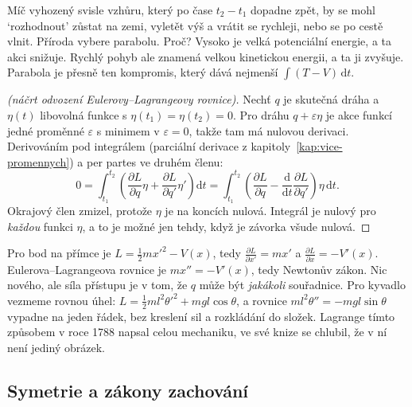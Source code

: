 Míč vyhozený svisle vzhůru, který po čase $t_2 - t_1$ dopadne zpět, by se mohl `rozhodnout' zůstat na zemi, vyletět výš a vrátit se rychleji, nebo se po cestě vlnit. Příroda vybere parabolu. Proč? Vysoko je velká potenciální energie, a ta akci snižuje. Rychlý pohyb ale znamená velkou kinetickou energii, a ta ji zvyšuje. Parabola je přesně ten kompromis, který dává nejmenší $\int(T - V)\,\mathrm{d}t$.

\begin{proof}[(náčrt odvození Eulerovy--Lagrangeovy rovnice)]
  Nechť $q$ je skutečná dráha a $\eta(t)$ libovolná funkce s $\eta(t_1) = \eta(t_2) = 0$. Pro dráhu $q + \varepsilon\eta$ je akce funkcí jedné proměnné $\varepsilon$ s minimem v $\varepsilon = 0$, takže tam má nulovou derivaci. Derivováním pod integrálem (parciální derivace z kapitoly~\ref{kap:vice-promennych}) a per partes ve druhém členu:
  \begin{equation*}
    0 = \int_{t_1}^{t_2}\left(\frac{\partial L}{\partial q}\eta + \frac{\partial L}{\partial q'}\eta'\right)\mathrm{d}t = \int_{t_1}^{t_2}\left(\frac{\partial L}{\partial q} - \frac{\mathrm{d}}{\mathrm{d}t}\frac{\partial L}{\partial q'}\right)\eta\,\mathrm{d}t.
  \end{equation*}
  Okrajový člen zmizel, protože $\eta$ je na koncích nulová. Integrál je nulový pro \textit{každou} funkci $\eta$, a to je možné jen tehdy, když je závorka všude nulová.
\end{proof}

Pro bod na přímce je $L = \frac{1}{2}mx'^2 - V(x)$, tedy $\frac{\partial L}{\partial x'} = mx'$ a $\frac{\partial L}{\partial x} = -V'(x)$. Eulerova--Lagrangeova rovnice je $mx'' = -V'(x)$, tedy Newtonův zákon. Nic nového, ale síla přístupu je v tom, že $q$ může být \textit{jakákoli} souřadnice. Pro kyvadlo vezmeme rovnou úhel: $L = \frac{1}{2}ml^2\theta'^2 + mgl\cos\theta$, a rovnice $ml^2\theta'' = -mgl\sin\theta$ vypadne na jeden řádek, bez kreslení sil a rozkládání do složek. Lagrange tímto způsobem v roce 1788 napsal celou mechaniku, ve své knize se chlubil, že v ní není jediný obrázek.

\subsection{Symetrie a zákony zachování}

